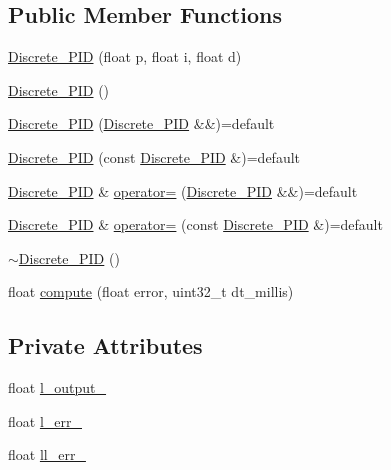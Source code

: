 \subsection*{Public Member Functions}
\begin{DoxyCompactItemize}
\item 
\mbox{\hyperlink{class_discrete___p_i_d_a85706a0b048068792beef25ad1972c3e}{Discrete\+\_\+\+P\+ID}} (float p, float i, float d)
\item 
\mbox{\hyperlink{class_discrete___p_i_d_a15ef57a76593edd62150e0eafe5211d8}{Discrete\+\_\+\+P\+ID}} ()
\item 
\mbox{\hyperlink{class_discrete___p_i_d_ab99d18b0bebf81ea27ca4fe2c9b0f3d6}{Discrete\+\_\+\+P\+ID}} (\mbox{\hyperlink{class_discrete___p_i_d}{Discrete\+\_\+\+P\+ID}} \&\&)=default
\item 
\mbox{\hyperlink{class_discrete___p_i_d_aaedf8e36ddb10c9998ff8edbca5ec42b}{Discrete\+\_\+\+P\+ID}} (const \mbox{\hyperlink{class_discrete___p_i_d}{Discrete\+\_\+\+P\+ID}} \&)=default
\item 
\mbox{\hyperlink{class_discrete___p_i_d}{Discrete\+\_\+\+P\+ID}} \& \mbox{\hyperlink{class_discrete___p_i_d_a8b710e438648c3cc88b643090074254b}{operator=}} (\mbox{\hyperlink{class_discrete___p_i_d}{Discrete\+\_\+\+P\+ID}} \&\&)=default
\item 
\mbox{\hyperlink{class_discrete___p_i_d}{Discrete\+\_\+\+P\+ID}} \& \mbox{\hyperlink{class_discrete___p_i_d_ae529dc65772963250ff74e0f5b579bcd}{operator=}} (const \mbox{\hyperlink{class_discrete___p_i_d}{Discrete\+\_\+\+P\+ID}} \&)=default
\item 
\mbox{\hyperlink{class_discrete___p_i_d_a87f9e2fc9b853704494941c92670a039}{$\sim$\+Discrete\+\_\+\+P\+ID}} ()
\item 
float \mbox{\hyperlink{class_discrete___p_i_d_aa4914b85e73cb5fdfcc5b40e8d0ff23c}{compute}} (float error, uint32\+\_\+t dt\+\_\+millis)
\end{DoxyCompactItemize}
\subsection*{Private Attributes}
\begin{DoxyCompactItemize}
\item 
float \mbox{\hyperlink{class_discrete___p_i_d_a1eecb5b2126d7f6787db1004f6d17632}{l\+\_\+output\+\_\+}}
\item 
float \mbox{\hyperlink{class_discrete___p_i_d_a20866866cf564262c74dabef26cc0372}{l\+\_\+err\+\_\+}}
\item 
float \mbox{\hyperlink{class_discrete___p_i_d_aeacdfd2929599c6217f8cd06df89eb21}{ll\+\_\+err\+\_\+}}
\end{DoxyCompactItemize}
